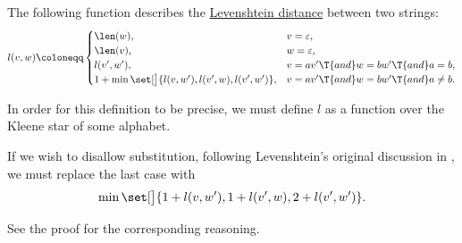 \begin{proposition}\label{thm:levenshtein_distance_characterization}
  The following function describes the \hyperref[def:levenshtein_distance]{Levenshtein distance} between two strings:
  \small
  \begin{equation}\label{eq:thm:levenshtein_distance_characterization}
    l(v, w) \coloneqq \begin{cases}
      \len(w),                                             &v = \varepsilon, \\
      \len(v),                                             &w = \varepsilon, \\
      l(v', w'),                                           &v = av' \T{and} w = bw' \T{and} a = b, \\
      1 + \min\set[\big]{ l(v, w'), l(v', w), l(v', w') }, &v = av' \T{and} w = bw' \T{and} a \neq b.
    \end{cases}
  \end{equation}
  \normalsize
\end{proposition}
\begin{comments}
  \item In order for this definition to be precise, we must define \( l \) as a function over the Kleene star of some alphabet.
  \item If we wish to disallow substitution, following Levenshtein's original discussion in \cite[2]{Левенштейн1965ДвоичныеКоды}, we must replace the last case with
  \begin{equation*}
    \min\set[\big]{ 1 + l(v, w'), 1 + l(v', w), 2 + l(v', w') }.
  \end{equation*}

  See the proof for the corresponding reasoning.
\end{comments}

